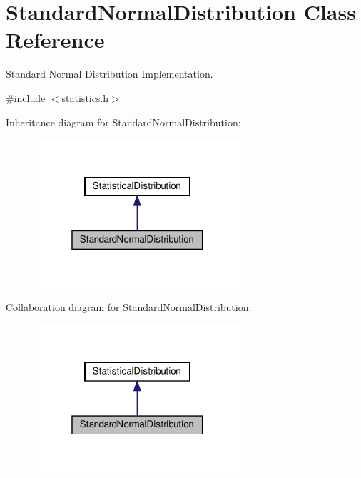 \hypertarget{classStandardNormalDistribution}{}\section{Standard\+Normal\+Distribution Class Reference}
\label{classStandardNormalDistribution}


Standard Normal Distribution Implementation.  




{\ttfamily \#include $<$statistics.\+h$>$}



Inheritance diagram for Standard\+Normal\+Distribution\+:
\nopagebreak
\begin{figure}[H]
\begin{center}
\leavevmode
\includegraphics[width=217pt]{classStandardNormalDistribution__inherit__graph}
\end{center}
\end{figure}


Collaboration diagram for Standard\+Normal\+Distribution\+:
\nopagebreak
\begin{figure}[H]
\begin{center}
\leavevmode
\includegraphics[width=217pt]{classStandardNormalDistribution__coll__graph}
\end{center}
\end{figure}
